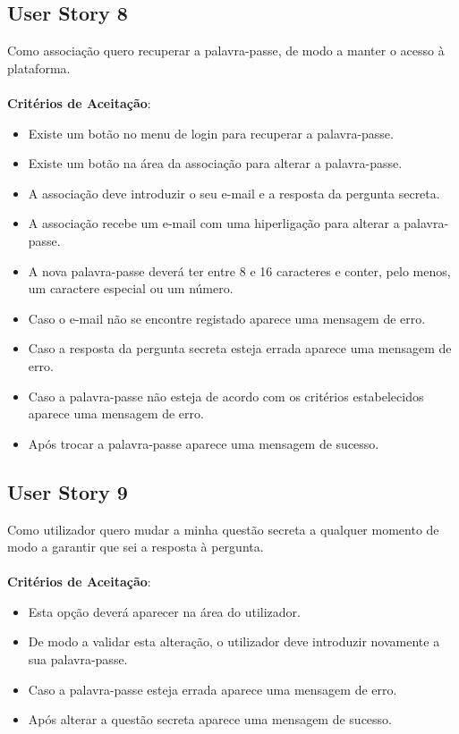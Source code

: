 \documentclass[a4paper,11pt]{article}
\begin{document}
\subsection*{User Story 8}
Como associação quero recuperar a palavra-passe, de modo a manter o acesso à plataforma.\\\\
\textbf{Critérios de Aceitação}:
\begin{itemize}
  \item Existe um botão no menu de login para recuperar a palavra-passe.
  \item Existe um botão na área da associação para alterar a palavra-passe.
  \item A associação deve introduzir o seu e-mail e a resposta da pergunta secreta.
  \item A associação recebe um e-mail com uma hiperligação para alterar a palavra-passe.
  \item A nova palavra-passe deverá ter entre 8 e 16 caracteres e conter, pelo menos, um caractere especial ou um número.
  \item Caso o e-mail não se encontre registado aparece uma mensagem de erro.
  \item Caso a resposta da pergunta secreta esteja errada aparece uma mensagem de erro.
  \item Caso a palavra-passe não esteja de acordo com os critérios estabelecidos aparece uma mensagem de erro.
  \item Após trocar a palavra-passe aparece uma mensagem de sucesso.
\end{itemize}

\subsection*{User Story 9}
Como utilizador quero mudar a minha questão secreta a qualquer momento de modo a garantir que sei a resposta à pergunta.\\\\
\textbf{Critérios de Aceitação}:
\begin{itemize}
  \item Esta opção deverá aparecer na área do utilizador.
  \item De modo a validar esta alteração, o utilizador deve introduzir novamente a sua palavra-passe.
  \item Caso a palavra-passe esteja errada aparece uma mensagem de erro.
  \item Após alterar a questão secreta aparece uma mensagem de sucesso.
\end{itemize}
\end{document}
